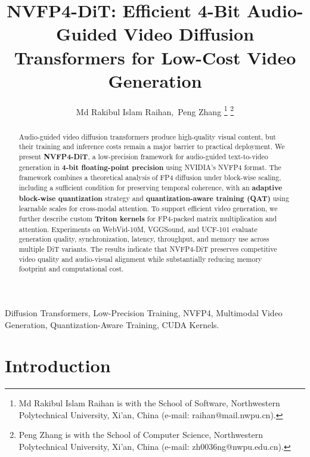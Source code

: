 \documentclass[journal,twoside]{IEEEtran}
\theoremstyle{definition}
\theoremstyle{remark}
\begin{document}
\title{NVFP4-DiT: Efficient 4-Bit Audio-Guided Video Diffusion Transformers for Low-Cost Video Generation}

\author{Md Rakibul Islam Raihan,~Peng Zhang%
\thanks{Md Rakibul Islam Raihan is with the School of Software, Northwestern Polytechnical University, Xi'an, China (e-mail: raihan@mail.nwpu.cn).}%
\thanks{Peng Zhang is with the School of Computer Science, Northwestern Polytechnical University, Xi'an, China (e-mail: zh0036ng@nwpu.edu.cn).}%
}

\maketitle

\begin{abstract}
Audio-guided video diffusion transformers produce high-quality visual content, but their training and inference costs remain a major barrier to practical deployment. We present \textbf{NVFP4-DiT}, a low-precision framework for audio-guided text-to-video generation in \textbf{4-bit floating-point precision} using NVIDIA's NVFP4 format. The framework combines a theoretical analysis of FP4 diffusion under block-wise scaling, including a sufficient condition for preserving temporal coherence, with an \textbf{adaptive block-wise quantization} strategy and \textbf{quantization-aware training (QAT)} using learnable scales for cross-modal attention. To support efficient video generation, we further describe custom \textbf{Triton kernels} for FP4-packed matrix multiplication and attention. Experiments on WebVid-10M, VGGSound, and UCF-101 evaluate generation quality, synchronization, latency, throughput, and memory use across multiple DiT variants. The results indicate that NVFP4-DiT preserves competitive video quality and audio-visual alignment while substantially reducing memory footprint and computational cost.
\end{abstract}

\begin{IEEEkeywords}
Diffusion Transformers, Low-Precision Training, NVFP4, Multimodal Video Generation, Quantization-Aware Training, CUDA Kernels.
\end{IEEEkeywords}

\section{Introduction}
\end{document}
